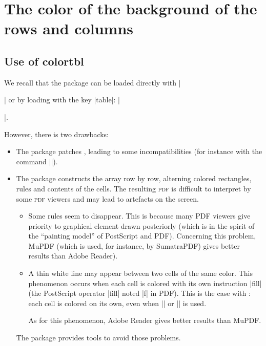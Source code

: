\documentclass[dvipsnames]{article}%
\begin{document}


\section{The color of the background of the rows and columns}


\subsection{Use of colortbl}


We recall that the package  can be loaded directly with
|\usepackage{colortbl}| or by loading  with the key |table|:
|\usepackage[table]{xcolor}|. 

\medskip
However, there is two drawbacks:
\begin{itemize}
\item The package  patches , leading to some
incompatibilities (for instance with the command |\hdotsfor|).

\item The package  constructs the array row by row, alterning
colored rectangles, rules and contents of the cells. The resulting
\textsc{pdf} is difficult to interpret by some \textsc{pdf} viewers and may
lead to artefacts on the screen.
\begin{itemize}
\item Some rules seem to disappear. This is because many PDF viewers give
priority to graphical element drawn posteriorly (which is in the spirit of the
``painting model'' of PostScript and PDF). Concerning this problem, MuPDF
(which is used, for instance, by SumatraPDF) gives better results than Adobe
Reader).
\item A thin white line may appear between two cells of the same color. This
phenomenon occurs when each cell is colored with its own instruction |fill|
(the PostScript operator |fill| noted |f| in PDF). This is the case with
: each cell is colored on its own, even when |\columncolor| or
|\rowcolor| is used.

As for this phenomenon, Adobe Reader gives better results than MuPDF.
\end{itemize}

The package  provides tools to avoid those problems.
\end{itemize}
\end{document}
